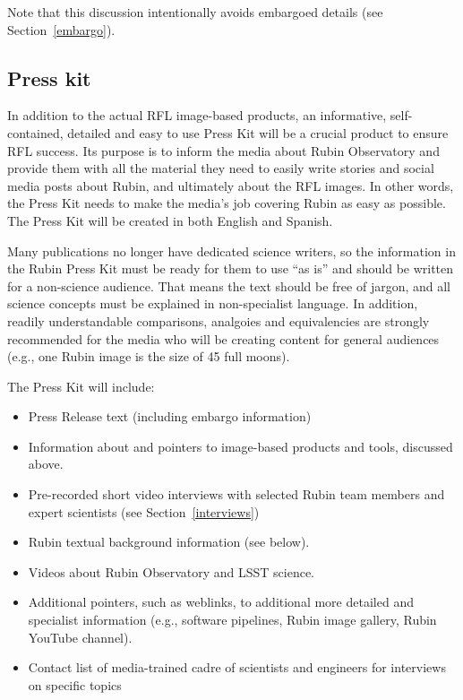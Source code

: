 Note that this discussion intentionally avoids embargoed details (see Section~\ref{embargo}). 


\subsection{Press kit}

In addition to the actual RFL image-based products, an informative, self-contained, detailed and easy to use Press Kit
will be a crucial product to ensure RFL success. Its purpose is to inform the media about Rubin Observatory and provide them with all the material they need to easily write stories and social media posts about Rubin, and ultimately about the RFL images.
In other words, the Press Kit needs to make the media’s job covering Rubin as easy as possible. 
The Press Kit will be created in both English and Spanish.

Many publications no longer have dedicated science writers, so the information in the Rubin Press Kit must be ready
for them to use ``as is'' and should be written for a non-science audience. That means the text should be free of jargon,
and all science concepts must be explained in non-specialist language. In addition, readily understandable comparisons,
analgoies and equivalencies are strongly recommended for the media who will be creating content for general audiences
(e.g., one Rubin image is the size of 45 full moons).

The Press Kit will include: 
\begin{itemize}
\item Press Release text (including embargo information) 
\item Information about and pointers to image-based products and tools, discussed above.
\item Pre-recorded short video interviews with selected Rubin team members and expert scientists (see Section~\ref{interviews}) 
\item Rubin textual background information (see below).
\item Videos about Rubin Observatory and LSST science. 
\item Additional pointers, such as weblinks, to additional more detailed and specialist information (e.g., software pipelines,
           Rubin image gallery, Rubin YouTube channel).
\item Contact list of media-trained cadre of scientists and engineers for interviews on specific topics

\end{itemize}

